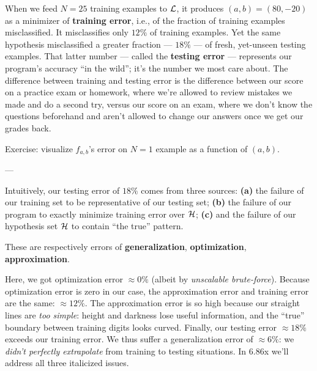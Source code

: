 \documentclass[11pt, justified]{tufte-book}
\newcommand{\attn}[1]{{\bro \textsf{#1}}}
\newcommand{\plainfootprint}{}
\newcommand{\footprint}{\marginnote{\plainfootprint} }
\newcommand{\sampassage}[1]{
   \vspace{0.1cm}
   \par\noindent{\hspace{-2cm}\normalsize \sc \gre #1} ---
}
\theoremstyle{definition}
\begin{document}
        When we feed $N=25$ training examples to $\mathcal{L}$, it produces
        $(a,b)=(80,-20)$ as a minimizer of \textbf{training error}, i.e.,
        of the fraction of training examples misclassified.  It misclassifies
        only $12\%$ of training examples.\footprint Yet the same
        hypothesis misclassified a greater fraction --- $18\%$ --- of fresh,
        yet-unseen testing examples.
        That latter number --- called the \textbf{testing error} --- represents
        our program's accuracy ``in the wild'';
        it's the number we most care about.  The difference between training
        and testing error is the difference between our score on a practice
        exam or homework, where we're allowed to review mistakes we made and
        do a second try, versus our score on an exam, where we don't know the
        questions beforehand and aren't allowed to change our answers once we
        get our grades back.

        \noindent
        \attn{Exercise:} {visualize $f_{a,b}$'s error on $N=1$ example as a 
        function of $(a,b)$.}\footprint


      \sampassage{error analysis}
        Intuitively, our testing error of $18\%$ comes from three sources:
        \textbf{(a)} the failure of our training set to be representative of our testing set; 
        \textbf{(b)} the failure of our program to exactly minimize training error over $\mathcal{H}$;
        \textbf{(c)} and the failure of our hypothesis set $\mathcal{H}$ to contain ``the true'' pattern. 

        These are respectively errors of
        \textbf{generalization},
        \textbf{optimization},
        \textbf{approximation}.

        Here, we got optimization error $\approx 0\%$ (albeit by
        \emph{unscalable brute-force}).  Because optimization error is zero in
        our case, the approximation error and training error are the same:
        $\approx12\%$.  The approximation error is so high because our straight
        lines are \emph{too simple}: height and darkness lose useful
        information, and the ``true'' boundary between training digits looks
        curved.\footprint
        Finally, our testing error $\approx 18\%$ exceeds our training error.
        We thus suffer a generalization error of $\approx 6\%$: we \emph{didn't
        perfectly extrapolate} from training to testing situations.
        In 6.86x we'll address all three italicized issues.
\end{document}
